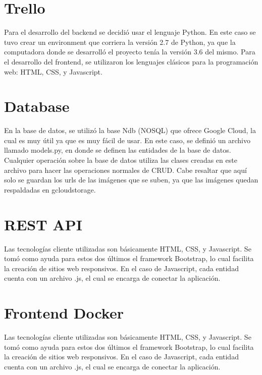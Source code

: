 \documentclass{article}
\begin{document}
	
	\section{Trello}
	Para el desarrollo del backend se decidió usar el lenguaje Python. En este caso se tuvo crear un environment que corriera la versión 2.7 de Python, ya que la computadora donde se desarrolló el proyecto tenía la versión 3.6 del mismo.
	\linebreak
	Para el desarrollo del frontend, se utilizaron los lenguajes clásicos para la programación web: HTML, CSS, y Javascript.
	
	
	\section{Database}
	En la base de datos, se utilizó la base Ndb (NOSQL) que ofrece Google Cloud, la cual es muy útil ya que es muy fácil de usar.
	\linebreak
	En este caso, se definió un archivo llamado models.py, en donde se definen las entidades de la base de datos. Cualquier operación sobre la base de datos utiliza las clases creadas en este archivo para  hacer las operaciones normales de CRUD.
	\linebreak
	Cabe resaltar que aquí solo se guardan los urls de las imágenes que se suben, ya que las imágenes quedan respaldadas en gcloudstorage.
	
	
	\section{REST API}
	Las tecnologías cliente utilizadas son básicamente HTML, CSS, y Javascript. Se tomó como ayuda para estos dos últimos el framework Bootstrap, lo cual facilita la creación de sitios web responsivos.
	\linebreak
	En el caso de Javascript, cada entidad cuenta con un archivo .js, el cual se encarga de conectar la aplicación. 
	
	\section{Frontend Docker}
	Las tecnologías cliente utilizadas son básicamente HTML, CSS, y Javascript. Se tomó como ayuda para estos dos últimos el framework Bootstrap, lo cual facilita la creación de sitios web responsivos.
	\linebreak
	En el caso de Javascript, cada entidad cuenta con un archivo .js, el cual se encarga de conectar la aplicación. 
	
\end{document}
